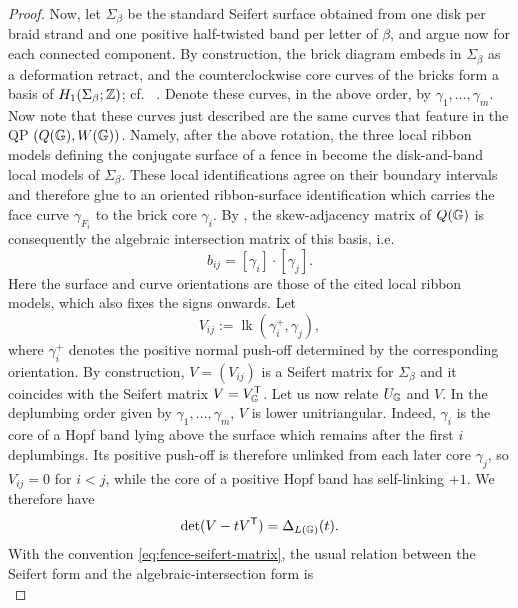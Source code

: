 \begin{proof}
Now, let $\Sigma_\beta$ be the standard Seifert surface obtained from one disk per
braid strand and one positive half-twisted band per letter of $\beta$, and argue now for each connected component. By construction, the brick diagram embeds in $\Sigma_\beta$ as a deformation
retract, and the counterclockwise core curves of the bricks form a basis of
$H_1(\Sigma_\beta;\mathbb Z)$; cf.~
\cite[Section~2]{Ferretti}.
Denote these curves, in the above order, by
$\gamma_1,\ldots,\gamma_m$. Now note that these curves just described are the same curves that feature in the QP $(Q(\mathbb G),W(\mathbb G))$.  Namely, after the above rotation, the three local ribbon
models defining the conjugate surface of a fence in
\cite[Section~3]{CasalsGao} become the disk-and-band
local models of $\Sigma_\beta$.  These local identifications agree on their
boundary intervals and therefore glue to an oriented ribbon-surface
identification which carries the face curve $\gamma_{F_i}$ to the brick core
$\gamma_i$.  By \cite[Def.~2.2\&Prop.~3.7]{CasalsGao}, the
skew-adjacency matrix of $Q(\mathbb G)$ is consequently the algebraic intersection
matrix of this basis, i.e.
\begin{equation}\label{eq:fence-B-intersection}
 b_{ij}=[\gamma_i]\cdot[\gamma_j].
\end{equation}
Here the surface and curve orientations are those of the cited local ribbon
models, which also fixes the signs onwards. Let
\begin{equation}\label{eq:fence-seifert-matrix}
 V_{ij}:=\operatorname{lk}(\gamma_i^+,\gamma_j),
\end{equation}
where $\gamma_i^+$ denotes the positive normal push-off determined by the
corresponding orientation. By construction, $V=(V_{ij})$ is a Seifert matrix for
$\Sigma_\beta$ and it coincides with the Seifert matrix $V=V_\mathbb G^{\mathsf T}$. Let us now relate $U_\mathbb G$ and $V$. In the deplumbing order given by $\gamma_1,\ldots,\gamma_m$, $V$ is lower
unitriangular. Indeed, $\gamma_i$ is the core of a Hopf band lying above the
surface which remains after the first $i$ deplumbings.  Its positive push-off
is therefore unlinked from each later core $\gamma_j$, so $V_{ij}=0$ for
$i<j$, while the core of a positive Hopf band has self-linking $+1$. We therefore have
\begin{equation}\label{eq:V_is_Seifert}
\det(V-tV^{\mathsf T}) =\Delta_{L(\mathbb G)}(t).
\end{equation}
With the convention \eqref{eq:fence-seifert-matrix}, the usual relation
between the Seifert form and the algebraic-intersection form is
\begin{equation}\label{eq:seifert-intersection-convention}

\end{equation}
\end{proof}
